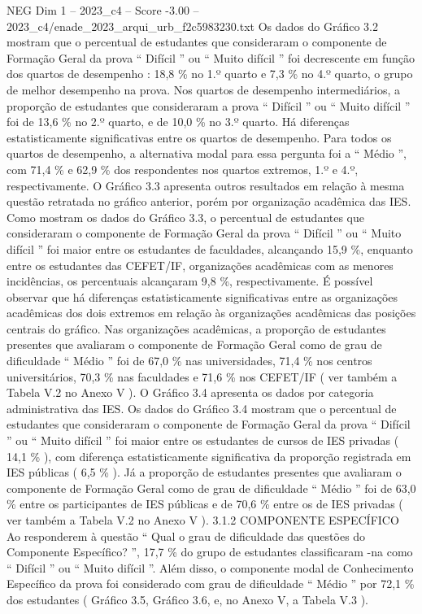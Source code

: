 \begin{textsample}{NEG Dim 1 – 2023\_c4 – Score -3.00 – 2023\_c4/enade\_2023\_arqui\_urb\_f2c5983230.txt}
Os dados do Gráfico 3.2 mostram que o percentual de estudantes que consideraram o componente de Formação Geral da prova “ Difícil ” ou “ Muito difícil ” foi decrescente em função dos quartos de desempenho : 18,8 \% no 1.º quarto e 7,3 \% no 4.º quarto, o grupo de melhor desempenho na prova.
Nos quartos de desempenho intermediários, a proporção de estudantes que consideraram a prova “ Difícil ” ou “ Muito difícil ” foi de 13,6 \% no 2.º quarto, e de 10,0 \% no 3.º quarto.
Há diferenças estatisticamente significativas entre os quartos de desempenho.
Para todos os quartos de desempenho, a alternativa modal para essa pergunta foi a “ Médio ”, com 71,4 \% e 62,9 \% dos respondentes nos quartos extremos, 1.º e 4.º, respectivamente.
O Gráfico 3.3 apresenta outros resultados em relação à mesma questão retratada no gráfico anterior, porém por organização acadêmica das IES.
Como mostram os dados do Gráfico 3.3, o percentual de estudantes que consideraram o componente de Formação Geral da prova “ Difícil ” ou “ Muito difícil ” foi maior entre os estudantes de faculdades, alcançando 15,9 \%, enquanto entre os estudantes das CEFET/IF, organizações acadêmicas com as menores incidências, os percentuais alcançaram 9,8 \%, respectivamente.
É possível observar que há diferenças estatisticamente significativas entre as organizações acadêmicas dos dois extremos em relação às organizações acadêmicas das posições centrais do gráfico.
Nas organizações acadêmicas, a proporção de estudantes presentes que avaliaram o componente de Formação Geral como de grau de dificuldade “ Médio ” foi de 67,0 \% nas universidades, 71,4 \% nos centros universitários, 70,3 \% nas faculdades e 71,6 \% nos CEFET/IF ( ver também a Tabela V.2 no Anexo V ).
O Gráfico 3.4 apresenta os dados por categoria administrativa das IES.
Os dados do Gráfico 3.4 mostram que o percentual de estudantes que consideraram o componente de Formação Geral da prova “ Difícil ” ou “ Muito difícil ” foi maior entre os estudantes de cursos de IES privadas ( 14,1 \% ), com diferença estatisticamente significativa da proporção registrada em IES públicas ( 6,5 \% ).
Já a proporção de estudantes presentes que avaliaram o componente de Formação Geral como de grau de dificuldade “ Médio ” foi de 63,0 \% entre os participantes de IES públicas e de 70,6 \% entre os de IES privadas ( ver também a Tabela V.2 no Anexo V ). 3.1.2 COMPONENTE ESPECÍFICO Ao responderem à questão “ Qual o grau de dificuldade das questões do Componente Específico? ”, 17,7 \% do grupo de estudantes classificaram -na como “ Difícil ” ou “ Muito difícil ”.
Além disso, o componente modal de Conhecimento Específico da prova foi considerado com grau de dificuldade “ Médio ” por 72,1 \% dos estudantes ( Gráfico 3.5, Gráfico 3.6, e, no Anexo V, a Tabela V.3 ).

\end{textsample}
